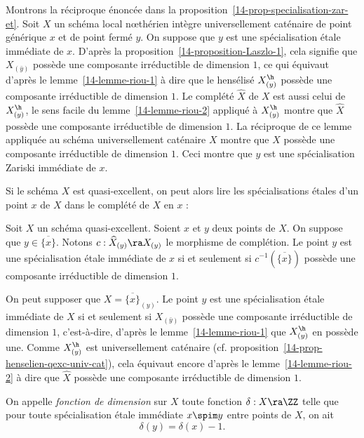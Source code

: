 \documentclass[10pt]{../fichiers-configuration-latex/smfart}
\begin{document}
Montrons la réciproque énoncée dans la proposition~\ref{14-prop-specialisation-zar-et}. Soit $X$ un
schéma local nœthérien intègre universellement caténaire de point générique $x$ et de point fermé
$y$. On suppose que $y$ est une spécialisation étale immédiate de $x$. D'après la
proposition~\ref{14-proposition-Laszlo-1}, cela signifie que $X_{(\bar y)}$ possède une composante
irréductible de dimension $1$, ce qui équivaut d'après le lemme~\ref{14-lemme-riou-1} à dire que le
hensélisé $X_{(y)}^\h$ possède une composante irréductible de dimension $1$. Le complété
$\widehat{X}$ de $X$ est aussi celui de $X_{(y)}^\h$, le sens facile du lemme~\ref{14-lemme-riou-2}
appliqué à $X_{(y)}^\h$ montre que $\widehat{X}$ possède une composante irréductible de dimension
$1$. La réciproque de ce lemme appliquée au schéma universellement caténaire $X$ montre que $X$
possède une composante irréductible de dimension $1$. Ceci montre que $y$ est une spécialisation
Zariski immédiate de $x$.

\bigskip

Si le schéma $X$ est quasi-excellent, on peut alors lire les spécialisations étales d'un point $x$
de $X$ dans le complété de $X$ en $x$ :

\begin{proposition2}\label{14-prop-Laszlo-2} Soit $X$ un schéma quasi-excellent. Soient $x$ et $y$
deux points de $X$. On suppose que $y\in\overline{\{x\}}$. Notons $c:\widehat X_{(y)}\ra X_{(y)}$ le
morphisme de complétion. Le point $y$ est une spécialisation étale immédiate de $x$ si et seulement
si $c^{-1}(\overline{\{x\}})$ possède une composante irréductible de dimension $1$.
\end{proposition2}

\begin{démo} On peut supposer que $X=\overline{\{x\}}_{(y)}$. Le point $y$ est une spécialisation
étale immédiate de $X$ si et seulement si $X_{(\bar y)}$ possède une composante irréductible de
dimension $1$, c'est-à-dire, d'après le lemme~\ref{14-lemme-riou-1} que $X_{(y)}^\h$ en possède une.
Comme $X_{(y)}^\h$ est universellement caténaire (cf.
proposition~\ref{14-prop-henselien-qexc-univ-cat}), cela équivaut encore d'après le
lemme~\ref{14-lemme-riou-2} à dire que $\widehat{X}$ possède une composante irréductible de
dimension $1$.  \end{démo}

\medskip

\begin{definition2} \label{ddefi4} On appelle \emph{fonction de dimension} sur $X$ toute fonction
$\delta  : X \ra \ZZ $ telle que pour toute spécialisation étale immédiate $x \spim y$ entre points
de $X$, on ait $$\delta(y) = \delta(x) - 1.$$ \end{definition2}
\end{document}
